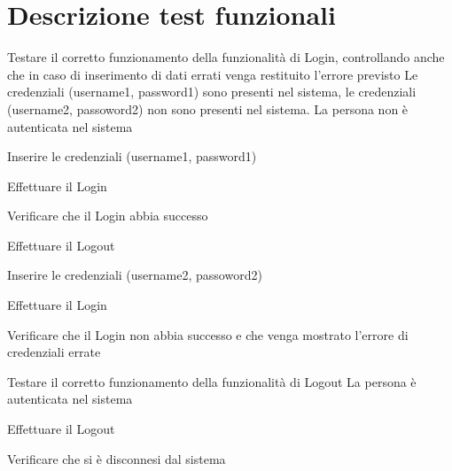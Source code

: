 \section{Descrizione test funzionali}
{Testare il corretto funzionamento della funzionalità di Login, controllando anche che in caso di inserimento di dati errati venga restituito l'errore previsto}
{Le credenziali (username1, password1) sono presenti nel sistema, le credenziali (username2, passoword2) non sono presenti nel sistema. La persona non è autenticata nel sistema}
{\begin{enumCU}
	\item Inserire le credenziali (username1, password1)
	\item Effettuare il Login
	\item Verificare che il Login abbia successo
	\item Effettuare il Logout
	\item Inserire le credenziali (username2, passoword2)
	\item Effettuare il Login
	\item Verificare che il Login non abbia successo e che venga mostrato l'errore di credenziali errate
\end{enumCU}
}


{Testare il corretto funzionamento della funzionalità di Logout}
{La persona è autenticata nel sistema}
{\begin{enumCU}
	\item Effettuare il Logout
	\item Verificare che si è disconnesi dal sistema
\end{enumCU}
}


